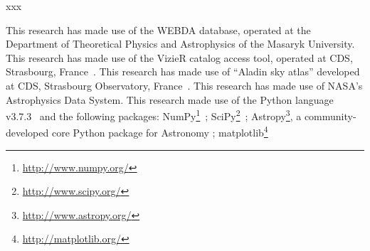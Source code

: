 \documentclass{aa}
\begin{document}
xxx

\begin{acknowledgements}
This research has made use of the WEBDA database, operated at the Department of
Theoretical Physics and Astrophysics of the Masaryk University.
%
This research has made use of the VizieR catalog access tool, operated at CDS,
Strasbourg, France~\citep{Ochsenbein_2000}.
%
This research has made use of ``Aladin sky atlas'' developed at
CDS, Strasbourg Observatory, France~\citep{Bonnarel2000,Boch2014}.
%
This research has made use of NASA's Astrophysics Data System.
%
This research made use of the Python language v3.7.3~\citep{vanRossum_1995}
and the following packages:
NumPy\footnote{\url{http://www.numpy.org/}}~\citep{vanDerWalt_2011};
SciPy\footnote{\url{http://www.scipy.org/}}~\citep{Jones_2001};
Astropy\footnote{\url{http://www.astropy.org/}}, a community-developed core
Python package for Astronomy \citep{Astropy_2013};
matplotlib\footnote{\url{http://matplotlib.org/}}~\citep{hunter_2007}
\end{acknowledgements}





\end{document}

